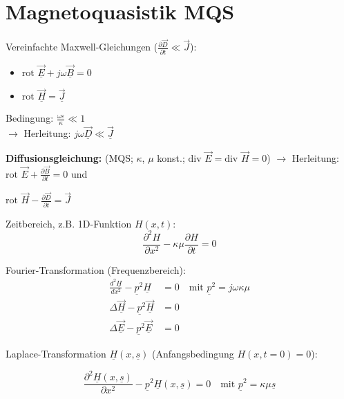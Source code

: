\section{Magnetoquasistik MQS}

Vereinfachte Maxwell-Gleichungen ($\frac{\partial \vec{D}}{\partial t} \ll \vec{J}$):

\begin{itemize}
\item $\text{rot } \underline{\vec{E}} + j\omega \underline{\vec{B}} = 0$
\item $\text{rot } \underline{\vec{H}} = \underline{\vec{J}}$
\end{itemize}

Bedingung: $\frac{\omega \varepsilon}{\kappa} \ll 1$\\
$\rightarrow$ Herleitung: $j\omega \underline{\vec{D}} \ll \underline{\vec{J}}$





\textbf{Diffusionsgleichung:} (MQS; $\kappa$, $\mu$ konst.; $\text{div } \vec{E} = \text{div } \vec{H} = 0$) \hfill $\rightarrow$ Herleitung: $\text{rot } \vec{E} + \frac{\partial \vec{B}}{\partial t} = 0$ und
\begin{flushright}
\phantom{$\rightarrow$ Herleitung: }$\text{rot } \vec{H} - \frac{\partial \vec{D}}{\partial t} = \vec{J}$
\end{flushright}


Zeitbereich, z.B. 1D-Funktion $H(x,t)$:
\begin{equation}
\frac{\partial^2 H}{\partial x^2} - \kappa\mu \frac{\partial H}{\partial t} = 0
\end{equation}


Fourier-Transformation (Frequenzbereich):
\begin{align}
\frac{d^2 \underline{H}}{dx^2} - \underline{p}^2 \underline{H} &= 0 \quad \text{mit } \underline{p}^2 = j\omega\kappa\mu \\
\Delta \underline{\vec{H}} - \underline{p}^2 \underline{\vec{H}} &= 0 \\
\Delta \underline{\vec{E}} - \underline{p}^2 \underline{\vec{E}} &= 0
\end{align}


Laplace-Transformation $\underline{H}(x, \underline{s})$ (Anfangsbedingung $H(x, t = 0) = 0$):

\begin{equation}
\frac{\partial^2 \underline{H}(x,\underline{s})}{\partial x^2} - \underline{p}^2 \underline{H}(x,\underline{s}) = 0 \quad \text{mit } \underline{p}^2 = \kappa\mu \underline{s}
\end{equation}

